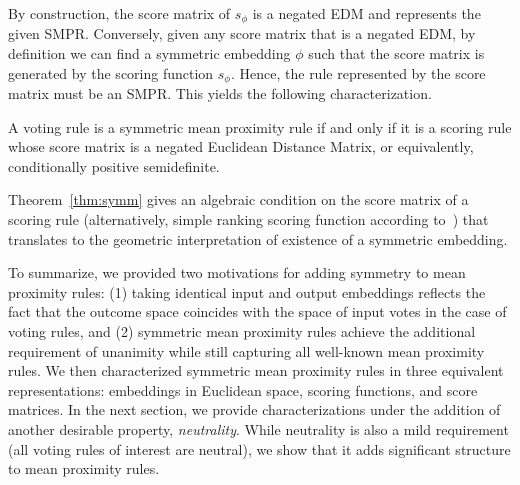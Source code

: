 \documentclass[prodmode,acmec]{ec-acmsmall}
\newcommand{\calL}{{\mathcal{L}}}
\newcommand{\rank}{{\calL(A)}}
\DeclareMathOperator*{\argmax}{arg\,max}
\DeclareMathOperator*{\argmin}{arg\,min}
\begin{document}
By construction, the score matrix of $s_{\phi}$ is a negated EDM and represents the given SMPR.  Conversely, given any score matrix that is a negated EDM, by definition we can find a symmetric embedding $\phi$ such that the score matrix is generated by the scoring function $s_{\phi}$. Hence, the rule represented by the score matrix must be an SMPR. This yields the following characterization. 
%
\begin{theorem}
A voting rule is a symmetric mean proximity rule if and only if it is a scoring rule whose score matrix is a negated Euclidean Distance Matrix, or equivalently, conditionally positive semidefinite. 
\label{thm:symm}
\end{theorem}
%
Theorem~\ref{thm:symm} gives an algebraic condition on the score matrix of a scoring rule (alternatively, simple ranking scoring function according to~\cite{CRX09}) that translates to the geometric interpretation of existence of a symmetric embedding. 

To summarize, we provided two motivations for adding symmetry to mean proximity rules: (1) taking identical input and output embeddings reflects the fact that the outcome space coincides with the space of input votes in the case of voting rules, and (2) symmetric mean proximity rules achieve the additional requirement of unanimity while still capturing all well-known mean proximity rules. We then characterized symmetric mean proximity rules in three equivalent representations: embeddings in Euclidean space, scoring functions, and score matrices. In the next section, we provide characterizations under the addition of another desirable property, \emph{neutrality}. While neutrality is also a mild requirement (all voting rules of interest are neutral), we show that it adds significant structure to mean proximity rules. 
\end{document}
